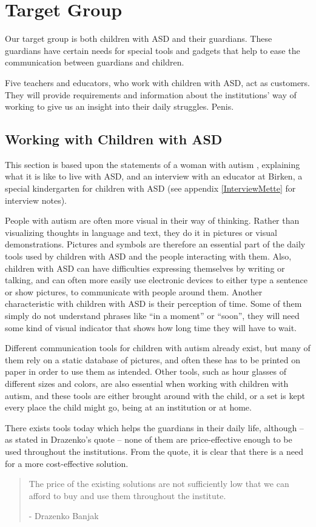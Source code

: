 \section{Target Group}
Our target group is both children with ASD and their guardians. These guardians have certain needs for special tools and gadgets that help to ease the communication between guardians and children.

Five teachers and educators, who work with children with ASD, act as customers. They will provide requirements and information about the institutions' way of working to give us an insight into their daily struggles. Penis.

\subsection{Working with Children with ASD}
This section is based upon the statements of a woman with autism \cite{autism.com}, explaining what it is like to live with ASD, and an interview with an educator at Birken, a special kindergarten for children with ASD (see appendix \ref{InterviewMette} for interview notes).

	People with autism are often more visual in their way of thinking. Rather than visualizing thoughts in language and text, they do it in pictures or visual demonstrations. Pictures and symbols are therefore an essential part of the daily tools used by children with ASD and the people interacting with them. Also, children with ASD can have difficulties expressing themselves by writing or talking, and can often more easily use electronic devices to either type a sentence or show pictures, to communicate with people around them.
	Another characteristic with children with ASD is their perception of time. Some of them simply do not understand phrases like "`in a moment"' or "`soon"', they will need some kind of visual indicator that shows how long time they will have to wait.

Different communication tools for children with autism already exist, but many of them rely on a static database of pictures, and often these has to be printed on paper in order to use them as intended. Other tools, such as hour glasses of different sizes and colors, are also essential when working with children with autism, and these tools are either brought around with the child, or a set is kept every place the child might go, being at an institution or at home.

There exists tools today which helps the guardians in their daily life, although -- as stated in Drazenko's quote -- none of them are price-effective enough to be used throughout the institutions. From the quote, it is clear that there is a need for a more cost-effective solution.

\begin{quotation}
The price of the existing solutions are not sufficiently low that we can afford to buy and use them throughout the institute.\\ 
	\begin{flushright}
		- Drazenko Banjak
	\end{flushright}
\end{quotation}